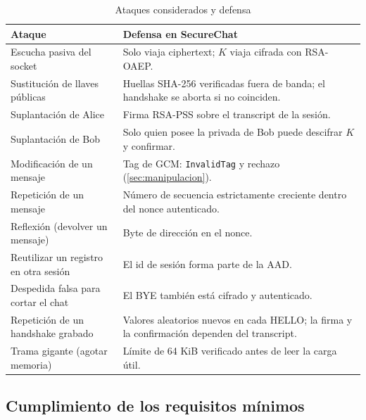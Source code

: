 \documentclass[11pt,a4paper]{article}
\theoremstyle{definition}
\theoremstyle{remark}
\newcommand{\code}[1]{\texttt{#1}}
\begin{document}
\begin{table}[H]
  \centering
  \caption{Ataques considerados y defensa}
  \label{tab:ataques}
  \small
  \begin{tabularx}{\linewidth}{@{}P{4.2cm} Y@{}}
    \toprule
    \textbf{Ataque} & \textbf{Defensa en SecureChat} \\
    \midrule
    Escucha pasiva del socket          & Solo viaja ciphertext; $K$ viaja cifrada con RSA-OAEP. \\
    Sustitución de llaves públicas     & Huellas SHA-256 verificadas fuera de banda; el handshake se aborta si no coinciden. \\
    Suplantación de Alice              & Firma RSA-PSS sobre el transcript de la sesión. \\
    Suplantación de Bob                & Solo quien posee la privada de Bob puede descifrar $K$ y confirmar. \\
    Modificación de un mensaje         & Tag de GCM: \code{InvalidTag} y rechazo (\cref{sec:manipulacion}). \\
    Repetición de un mensaje           & Número de secuencia estrictamente creciente dentro del nonce autenticado. \\
    Reflexión (devolver un mensaje)    & Byte de dirección en el nonce. \\
    Reutilizar un registro en otra sesión & El id de sesión forma parte de la AAD. \\
    Despedida falsa para cortar el chat & El BYE también está cifrado y autenticado. \\
    Repetición de un handshake grabado & Valores aleatorios nuevos en cada HELLO; la firma y la confirmación dependen del transcript. \\
    Trama gigante (agotar memoria)     & Límite de 64 KiB verificado antes de leer la carga útil. \\
    \bottomrule
  \end{tabularx}
\end{table}

\subsection{Cumplimiento de los requisitos mínimos}
\label{subsec:cumplimiento}
\end{document}

